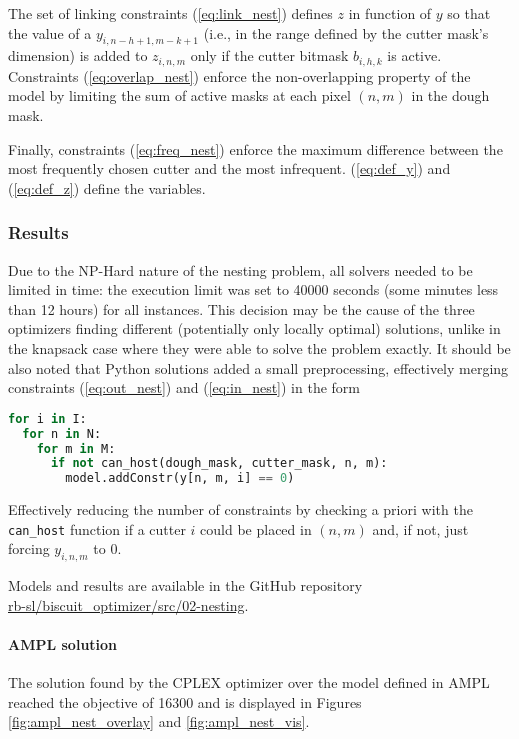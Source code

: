 The set of linking constraints (\ref{eq:link_nest}) defines $z$ in function of $y$ so that the value of a $y_{i, n-h+1, m-k+1}$ (i.e., in the range defined by the cutter mask's dimension) is added to $z_{i, n, m}$ only if the cutter bitmask $b_{i, h, k}$ is active. Constraints (\ref{eq:overlap_nest}) enforce the non-overlapping property of the model by limiting the sum of active masks at each pixel $(n, m)$ in the dough mask.

Finally, constraints (\ref{eq:freq_nest}) enforce the maximum difference between the most frequently chosen cutter and the most infrequent. (\ref{eq:def_y}) and (\ref{eq:def_z}) define the variables.

\subsubsection{Results}
Due to the NP-Hard nature of the nesting problem, all solvers needed to be limited in time: the execution limit was set to 40000 seconds (some minutes less than 12 hours) for all instances. This decision may be the cause of the three optimizers finding different (potentially only locally optimal) solutions, unlike in the knapsack case where they were able to solve the problem exactly. It should be also noted that Python solutions added a small preprocessing, effectively merging constraints (\ref{eq:out_nest}) and (\ref{eq:in_nest}) in the form
\begin{lstlisting}[language=Python]
for i in I:
  for n in N:
    for m in M:
      if not can_host(dough_mask, cutter_mask, n, m):
        model.addConstr(y[n, m, i] == 0)
\end{lstlisting}
Effectively reducing the number of constraints by checking a priori with the \texttt{can\_host} function if a cutter $i$ could be placed in $(n, m)$ and, if not, just forcing $y_{i, n, m}$ to 0.

Models and results are available in the GitHub repository \\ \href{https://github.com/rb-sl/biscuit_optimizer/tree/main/src/02-nesting}{rb-sl/biscuit\_optimizer/src/02-nesting}.

\paragraph{AMPL solution}
The solution found by the CPLEX optimizer over the model defined in AMPL reached the objective of 16300 and is displayed in Figures \ref{fig:ampl_nest_overlay} and \ref{fig:ampl_nest_vis}.

